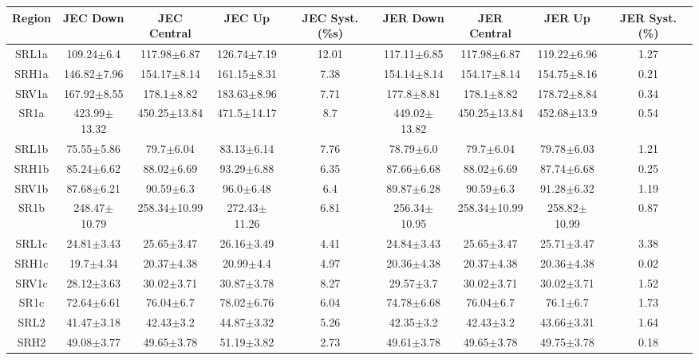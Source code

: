\documentclass[12pt]{paper}
\begin{document}
\begin{table}[ht]\begin{center}\resizebox{\textwidth}{!}
{\begin{tabular}{c|ccc|c|ccc|c}
    Region & JEC Down & JEC Central & JEC Up & JEC Syst. (\%s) & JER Down & JER Central & JER Up & JER Syst. (\%) \\ 
\hline
SRL1a & 109.24$\pm$6.4 & 117.98$\pm$6.87 & 126.74$\pm$7.19 & 12.01 & 117.11$\pm$6.85 & 117.98$\pm$6.87 & 119.22$\pm$6.96 & 1.27\\ 
SRH1a & 146.82$\pm$7.96 & 154.17$\pm$8.14 & 161.15$\pm$8.31 & 7.38 & 154.14$\pm$8.14 & 154.17$\pm$8.14 & 154.75$\pm$8.16 & 0.21\\ 
SRV1a & 167.92$\pm$8.55 & 178.1$\pm$8.82 & 183.63$\pm$8.96 & 7.71 & 177.8$\pm$8.81 & 178.1$\pm$8.82 & 178.72$\pm$8.84 & 0.34\\ 
\hline
SR1a & 423.99$\pm$13.32 & 450.25$\pm$13.84 & 471.5$\pm$14.17 & 8.7 & 449.02$\pm$13.82 & 450.25$\pm$13.84 & 452.68$\pm$13.9 & 0.54\\ 
\hline
SRL1b & 75.55$\pm$5.86 & 79.7$\pm$6.04 & 83.13$\pm$6.14 & 7.76 & 78.79$\pm$6.0 & 79.7$\pm$6.04 & 79.78$\pm$6.03 & 1.21\\ 
SRH1b & 85.24$\pm$6.62 & 88.02$\pm$6.69 & 93.29$\pm$6.88 & 6.35 & 87.66$\pm$6.68 & 88.02$\pm$6.69 & 87.74$\pm$6.68 & 0.25\\ 
SRV1b & 87.68$\pm$6.21 & 90.59$\pm$6.3 & 96.0$\pm$6.48 & 6.4 & 89.87$\pm$6.28 & 90.59$\pm$6.3 & 91.28$\pm$6.32 & 1.19\\ 
\hline
SR1b & 248.47$\pm$10.79 & 258.34$\pm$10.99 & 272.43$\pm$11.26 & 6.81 & 256.34$\pm$10.95 & 258.34$\pm$10.99 & 258.82$\pm$10.99 & 0.87\\ 
\hline
SRL1c & 24.81$\pm$3.43 & 25.65$\pm$3.47 & 26.16$\pm$3.49 & 4.41 & 24.84$\pm$3.43 & 25.65$\pm$3.47 & 25.71$\pm$3.47 & 3.38\\ 
SRH1c & 19.7$\pm$4.34 & 20.37$\pm$4.38 & 20.99$\pm$4.4 & 4.97 & 20.36$\pm$4.38 & 20.37$\pm$4.38 & 20.36$\pm$4.38 & 0.02\\ 
SRV1c & 28.12$\pm$3.63 & 30.02$\pm$3.71 & 30.87$\pm$3.78 & 8.27 & 29.57$\pm$3.7 & 30.02$\pm$3.71 & 30.02$\pm$3.71 & 1.52\\ 
\hline
SR1c & 72.64$\pm$6.61 & 76.04$\pm$6.7 & 78.02$\pm$6.76 & 6.04 & 74.78$\pm$6.68 & 76.04$\pm$6.7 & 76.1$\pm$6.7 & 1.73\\ 
\hline
SRL2 & 41.47$\pm$3.18 & 42.43$\pm$3.2 & 44.87$\pm$3.32 & 5.26 & 42.35$\pm$3.2 & 42.43$\pm$3.2 & 43.66$\pm$3.31 & 1.64\\ 
SRH2 & 49.08$\pm$3.77 & 49.65$\pm$3.78 & 51.19$\pm$3.82 & 2.73 & 49.61$\pm$3.78 & 49.65$\pm$3.78 & 49.75$\pm$3.78 & 0.18\\ 

\end{tabular}}
\end{center}
\end{table}
\end{document}

